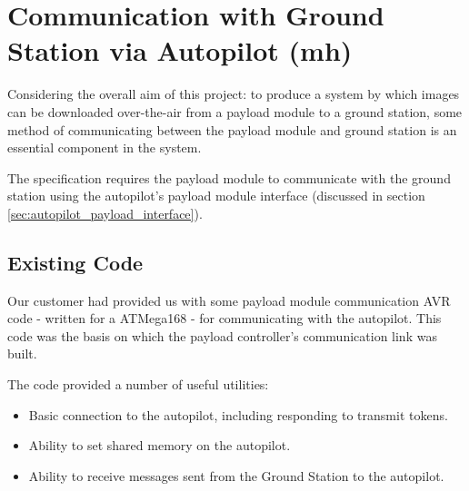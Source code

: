 \section{Communication with Ground Station via Autopilot (mh)}
\label{sec:payload controller}
Considering the overall aim of this project: to produce a system by which 
images can be downloaded over-the-air from a payload module to a ground 
station, some method of communicating between the
payload module and ground station is an essential component in the system.

The specification requires the payload
module to communicate with the ground station using the autopilot's payload
module interface (discussed in section \ref{sec:autopilot_payload_interface}).


\subsection{Existing Code}
\label{sec:payload_existing_code}
Our customer had provided us with some payload module communication AVR code
- written for a ATMega168 - for communicating with the autopilot. This code
was the basis on which the payload controller's communication link was built.

The code provided a number of useful utilities:
\begin{itemize}
\item Basic connection to the autopilot, including responding to transmit tokens.

\item Ability to set shared memory on the autopilot.

\item Ability to receive messages sent from the Ground Station to the 
autopilot.
\end{itemize}

